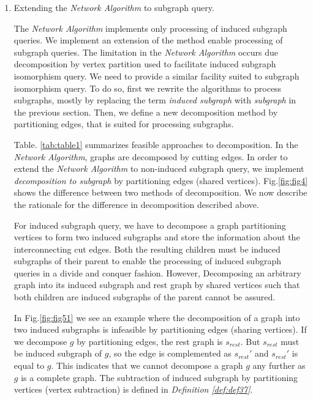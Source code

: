 \begin{enumerate}

\item Extending the \textit{Network Algorithm} to subgraph query.

The \textit{Network Algorithm} implements only processing of induced subgraph queries. We implement an extension of the method enable processing of subgraph queries. The limitation in the \textit{Network Algorithm} occurs due decomposition by vertex partition used to facilitate induced subgraph isomorphism query. We need to provide a similar facility suited to subgraph isomorphism query. To do so, first we rewrite the algorithms to process subgraphs, mostly by replacing the term \textit{induced subgraph} with \textit{subgraph} in the previous section. Then, we define a new decomposition method by partitioning edges, that is suited for processing subgraphs.


Table. \ref{tab:table1} summarizes feasible approaches to decomposition. In the \textit{Network Algorithm}, graphs are decomposed by cutting edges.
In order to extend the \textit{Network Algorithm} to non-induced subgraph query, we implement \textit{decomposition to subgraph} by partitioning edges (shared vertices). Fig.\ref{fig:fig4} shows the difference between two methods of decomposition. We now describe the rationale for the difference in decomposition described above.

For induced subgraph query, we have to decompose a graph partitioning vertices to form two induced subgraphs and store the information about the interconnecting cut edges. Both the resulting children must be induced subgraphs of their parent to enable the processing of induced subgraph queries in a divide and conquer fashion. However, Decomposing an arbitrary graph into its induced subgraph and rest graph by shared vertices such that both children are induced subgraphs of the parent cannot be assured.

In Fig.\ref{fig:fig51} we see an example where the decomposition of a graph into two induced subgraphs is infeasible by partitioning edges (sharing vertices).
If we decompose $g$ by partitioning edges, the rest graph is $s_{rest}$. But $s_{rest}$ must be induced subgraph of $g$, so the edge is complemented as $s_{rest}'$ and $s_{rest}'$ is equal to $g$. This indicates that we cannot decompose a graph $g$ any further as $g$ is a complete graph.
The subtraction of induced subgraph by partitioning vertices (vertex subtraction)  is defined in \textit{Definition \ref{def:def37}}.


\end{enumerate}
